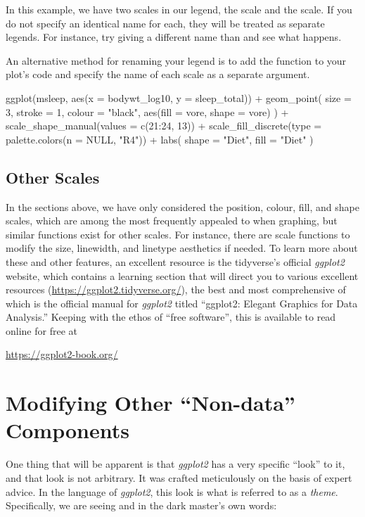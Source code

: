 In this example, we have two scales in our legend, the  scale and the  scale.  If you do not specify an identical name for each, they will be treated as separate legends. For instance, try giving  a different name than  and see what happens.

An alternative method for renaming your legend is to add the function  to your plot's code and specify the name of each scale as a separate argument.

\begin{inR}
ggplot(msleep, aes(x = bodywt_log10, y = sleep_total)) +
  geom_point(
    size = 3, stroke = 1, colour = "black",
    aes(fill = vore, shape = vore)
  ) +
  scale_shape_manual(values = c(21:24, 13)) +
  scale_fill_discrete(type = palette.colors(n = NULL, "R4")) +
  labs(
    shape = "Diet",
    fill = "Diet"
  )
\end{inR}

\vspace{1em}

\subsection{Other Scales}

In the sections above, we have only considered the position, colour, fill, and shape scales, which are among the most frequently appealed to when graphing, but similar functions exist for other scales. For instance, there are scale functions to modify the size, linewidth, and linetype aesthetics if needed. To learn more about these and other features, an excellent resource is the tidyverse's official \textit{ggplot2} website, which contains a learning section that will direct you to various excellent resources (\url{https://ggplot2.tidyverse.org/}), the best and most comprehensive of which is the official manual for \textit{ggplot2} titled ``ggplot2: Elegant Graphics for Data Analysis.'' Keeping with the ethos of ``free software'', this is available to read online for free at 

\begin{center}
\url{https://ggplot2-book.org/}
\end{center}

\section{Modifying Other ``Non-data'' Components}

One thing that will be apparent is that \textit{ggplot2} has a very specific ``look'' to it, and that look is not arbitrary. It was crafted meticulously on the basis of expert advice. In the language of \textit{ggplot2}, this look is what is referred to as a \textit{theme}.  Specifically, we are seeing  and in the dark master's own words:

